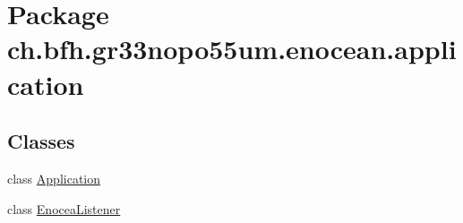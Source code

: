 \hypertarget{namespacech_1_1bfh_1_1gr33nopo55um_1_1enocean_1_1application}{}\section{Package ch.\+bfh.\+gr33nopo55um.\+enocean.\+application}
\label{namespacech_1_1bfh_1_1gr33nopo55um_1_1enocean_1_1application}
\subsection*{Classes}
\begin{DoxyCompactItemize}
\item 
class \hyperlink{classch_1_1bfh_1_1gr33nopo55um_1_1enocean_1_1application_1_1_application}{Application}
\item 
class \hyperlink{classch_1_1bfh_1_1gr33nopo55um_1_1enocean_1_1application_1_1_enocea_listener}{Enocea\+Listener}
\end{DoxyCompactItemize}
